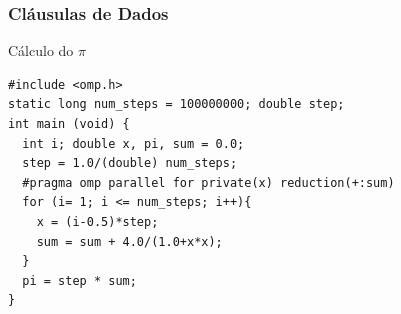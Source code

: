 \documentclass[xcolor={usenames,dvipsnames},12pt,presentation,aspectratio=169]{beamer}
\begin{document}
\begin{frame}[fragile]
  \frametitle{Cláusulas de Dados}
Cálculo do $\pi$
\begin{minipage}{0.95\textwidth}  
\begin{verbatim}  
#include <omp.h>
static long num_steps = 100000000; double step;
int main (void) {
  int i; double x, pi, sum = 0.0;
  step = 1.0/(double) num_steps;
  #pragma omp parallel for private(x) reduction(+:sum)
  for (i= 1; i <= num_steps; i++){
    x = (i-0.5)*step;
    sum = sum + 4.0/(1.0+x*x);
  }
  pi = step * sum;
}	  
\end{verbatim}
\end{minipage}
%
\end{frame}
\end{document}
